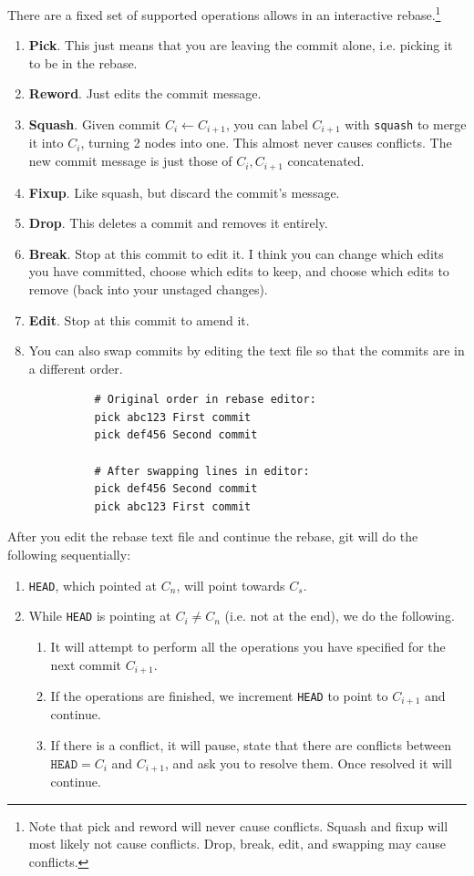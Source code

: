 \begin{definition}[Rebasing]
    There are a fixed set of supported operations allows in an interactive rebase.\footnote{Note that pick and reword will never cause conflicts. Squash and fixup will most likely not cause conflicts. Drop, break, edit, and swapping may cause conflicts.}
    \begin{enumerate}
      \item \textbf{Pick}. This just means that you are leaving the commit alone, i.e. picking it to be in the rebase. 
      \item \textbf{Reword}. Just edits the commit message. 
      \item \textbf{Squash}. Given commit $C_i \leftarrow C_{i+1}$, you can label $C_{i+1}$ with \texttt{squash} to merge it into $C_{i}$, turning 2 nodes into one. This almost never causes conflicts. The new commit message is just those of $C_{i}, C_{i+1}$ concatenated. 
      \item \textbf{Fixup}. Like squash, but discard the commit's message.  
      \item \textbf{Drop}. This deletes a commit and removes it entirely.  
      \item \textbf{Break}. Stop at this commit to edit it. I think you can change which edits you have committed, choose which edits to keep, and choose which edits to remove (back into your unstaged changes). 
      \item \textbf{Edit}. Stop at this commit to amend it. 
      \item You can also swap commits by editing the text file so that the commits are in a different order. 
        \begin{lstlisting}
          # Original order in rebase editor:
          pick abc123 First commit
          pick def456 Second commit

          # After swapping lines in editor:
          pick def456 Second commit
          pick abc123 First commit 
        \end{lstlisting}
    \end{enumerate} 
    After you edit the rebase text file and continue the rebase, git will do the following sequentially: 
    \begin{enumerate}
      \item \texttt{HEAD}, which pointed at $C_n$, will point towards $C_s$. 

      \item While \texttt{HEAD} is pointing at $C_i \neq C_n$ (i.e. not at the end), we do the following. 
        \begin{enumerate}
          \item It will attempt to perform all the operations you have specified for the next commit $C_{i+1}$. 
          \item If the operations are finished, we increment \texttt{HEAD} to point to $C_{i+1}$ and continue. 
          \item If there is a conflict, it will pause, state that there are conflicts between $\texttt{HEAD} = C_i$ and $C_{i+1}$, and ask you to resolve them. Once resolved it will continue. 
        \end{enumerate} 


\end{enumerate}
\end{definition}
